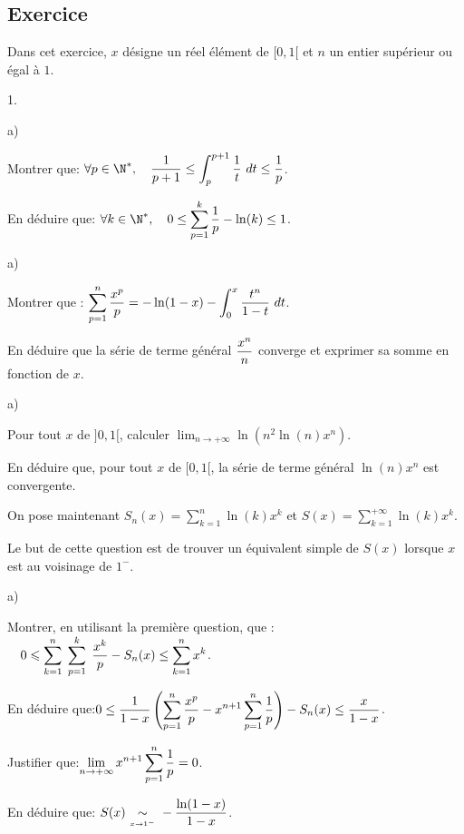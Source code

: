 \documentclass[11pt]{article}%
\begin{document}
\subsection*{Exercice}
\noindent
Dans cet exercice, $x$ d\'esigne un r\'eel \'el\'ement de $[0,1[$ et $n$ 
un entier
sup\'erieur ou \'egal \`a $1$.
\begin{noliste}{1.}
\item
\begin{noliste}{a)}
\item
Montrer que: $\displaystyle \forall p\in\N^*,\quad {1\over p+1}\le
\int_p^{p+1}{1\over t}\dt\le {1\over p}$.
\item
En d\'eduire que: $\displaystyle \forall k\in\N^*,\quad 0\le
\sum_{p=1}^k{1\over p}-\ln(k)\le 1$.
\end{noliste}
\item
\begin{noliste}{a)}
\vspace{-0.2cm}\item
Montrer que : $\displaystyle \sum_{p=1}^n{x^p\over
p}=-\ln(1-x)-\int_0^x{t^n\over 1-t} \ dt$.
\item

En d\'eduire que la s\'erie de terme g\'en\'eral $\displaystyle 
{x^n\over n}$ converge
et exprimer sa somme en fonction de $x$.
\end{noliste}

\item
\begin{noliste}{a)}
\item
Pour tout $x$ de $]0,1[$, calculer $\displaystyle
\lim_{n\to+\infty}\ln(n^2\ln(n)x^n)$.
\item
En d\'eduire que, pour tout $x$ de $[0,1[$, la s\'erie de terme 
g\'en\'eral $\ln(n)x^n$
est convergente.

\hskip -8mm On pose maintenant $\displaystyle 
S_n(x)=\sum_{k=1}^n\ln(k)x^k$ et
$\displaystyle S(x)=\sum_{k=1}^{+\infty}\ln(k)x^k$.
\end{noliste}
\item
Le but de cette question est de trouver un \'equivalent simple de $S(x)$ 
lorsque
$x$ est au voisinage de $1^-$.
\begin{noliste}{a)}
\item
Montrer, en utilisant la premi\`ere question, que :
$\quad  0\leqslant \displaystyle\sum\limits_{k=1}^{n}\hspace{.1cm}\displaystyle\sum\limits_{p=1}^{k}\hspace{.1cm}{x^k\over p}-S_n(x)\le 
\sum_{k=1}^nx^k$.
\item
En d\'eduire que:\quad$\displaystyle 0\le {1\over 
1-x}\left(\sum_{p=1}^n{x^p\over
p}-x^{n+1}\sum_{p=1}^n{1\over p}\right)-S_n(x)\le {x\over 1-x}$.
\item
Justifier que:\quad $\displaystyle 
\lim_{n\to+\infty}x^{n+1}\sum_{p=1}^n{1\over
p}=0$.
\item
En d\'eduire que: \quad $\displaystyle 
S(x){\ \underset {{\overset {x \to 1^-}{}}}{\sim}\ }-{\ln(1-x)\over 1-x}$.
\end{noliste}
\end{noliste}
\end{document}

